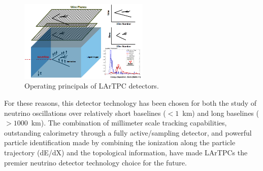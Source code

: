 \begin{figure}[htb]
\centering
\includegraphics[width=0.55\textwidth]{images/lartpc.png}
\caption[]{Operating principals of LArTPC detectors.}
\label{fig:LArTPC}
\end{figure}

For these reasons, this detector technology has been chosen for both the study of neutrino oscillations over relatively short baselines ($<1$~km) and long baselines ($>1000$~km). The combination of millimeter scale tracking capabilities, outstanding calorimetry through a fully active/sampling detector, and powerful particle identification made by combining the ionization along the particle trajectory (dE/dX) and the topological information, have made LArTPCs the premier neutrino detector technology choice for the future. 




